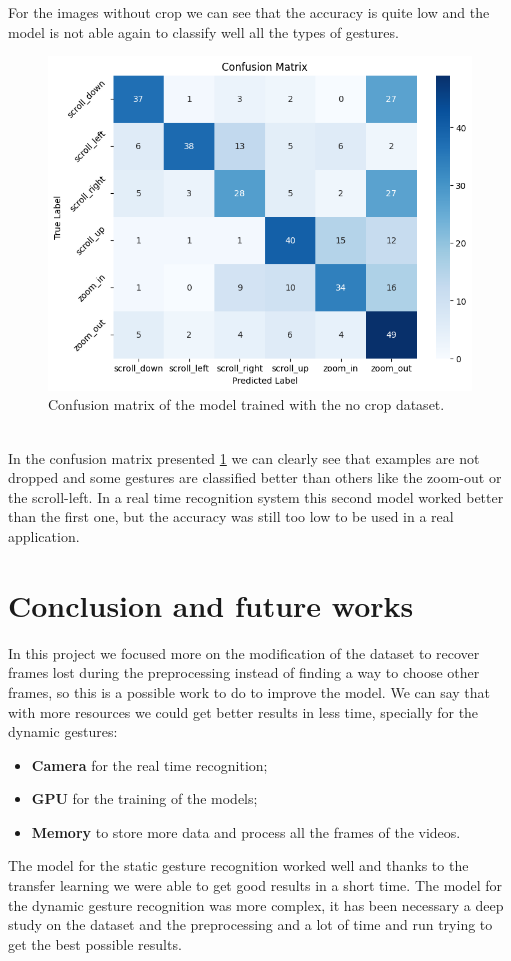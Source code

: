 \documentclass[10pt,twocolumn,letterpaper]{article}
\begin{document}
For the images without crop we can see that the accuracy is quite low and the model is not 
able again to classify well all the types of gestures.
\begin{figure}[h]
   \centering
   \includegraphics[width=1\linewidth]{images/matrix_confusion2.png}
   \caption{Confusion matrix of the model trained with the no crop dataset.}
   \label{fig:noCropConfusionMatrix}
\end{figure} \\
In the confusion matrix presented \ref{fig:noCropConfusionMatrix} we can clearly see 
that examples are not dropped and some gestures are classified better than others like the zoom-out 
or the scroll-left. In a real time recognition system this second model worked better than the 
first one, but the accuracy was still too low to be used in a real application.

\section{Conclusion and future works}
In this project we focused more on the modification of the dataset to recover frames lost 
during the preprocessing instead of finding a way to choose other frames, so this is 
a possible work to do to improve the model.
We can say that with more resources we could get better results in less time, 
specially for the dynamic gestures:
\begin{itemize}
   \item \textbf{Camera} for the real time recognition;
   \item \textbf{GPU} for the training of the models;
   \item \textbf{Memory} to store more data and process all the frames of the videos.
\end{itemize}
The model for the static gesture recognition worked well and thanks to the transfer learning 
we were able to get good results in a short time. The model for the dynamic gesture recognition
was more complex, it has been necessary a deep study on the dataset and the preprocessing and a lot of time 
and run trying to get the best possible results.

{\small


}
\end{document}
